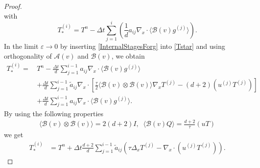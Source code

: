 \documentclass[final,11pt]{siamart251216}
\newcommand{\A}{\mathcal{A}}
\newcommand{\B}{\mathcal{B}}
\numberwithin{equation}{section}
\theoremstyle{definition}
\theoremstyle{remark}
\begin{document}
\begin{proof}
\begin{equation}
\end{equation}
with
\begin{equation}
	\label{Tstar}
	T_*^{(i)} = T^n - \Delta t  \sum_{j = 1}^i \left( \frac{1}{d} a_{ij} \nabla_x \cdot \langle \mathcal{B}(v) g^{(j)} \rangle  \right) .
\end{equation}
 In the limit $\varepsilon \to 0$ by inserting \eqref{InternalStagesForg} into \eqref{Tstar} and using orthogonality of $\A(v)$ and $\B(v)$, we obtain
\begin{equation}
\label{eq:T_star_stage}
\begin{split}
T_*^{(i)} = \, & T^n - \frac{\Delta t}{d} \sum_{j = 1}^{i-1} a_{ij} \nabla_x \cdot \langle \mathcal{B}(v) g^{(j)} \rangle \\
& + \frac{\Delta t}{d} \sum_{j=1}^{i-1} \tilde{a}_{ij} \nabla_x \cdot \left[ \frac{\tau}{2} \langle \mathcal{B}(v) \otimes \mathcal{B}(v) \rangle \nabla_x T^{(j)} - (d+2)(u^{(j)}T^{(j)}) \right] \\
& + \frac{\Delta t}{d} \sum_{j = 1}^{i-1} a_{ij} \nabla_x \cdot \langle \mathcal{B}(v) g^{(j)} \rangle.
\end{split}
\end{equation}
By using the following properties 
\begin{equation}
\begin{split}
\langle \mathcal{B}(v) \otimes \mathcal{B}(v) \rangle = 2(d+2)I , \;\; 
\langle \mathcal{B}(v) Q \rangle = \frac{d+2}{\tau} (uT)
\end{split}
\end{equation}
we get
\begin{equation}\begin{split} 
T_*^{(i)} &= T^n + \Delta t \frac{d+2}{d} \sum_{j=1}^{i-1} \tilde{a}_{ij} \left( \tau \Delta_x T^{(j)} - \nabla_x \cdot (u^{(j)}T^{(j)}) \right).
\end{split}

\end{equation}
\end{proof}
\end{document}
